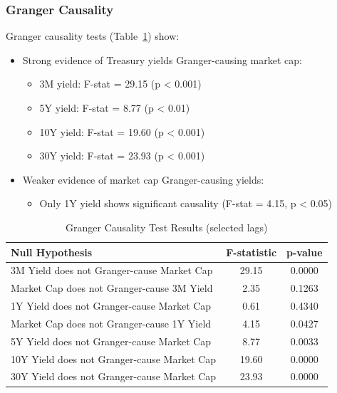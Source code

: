 \documentclass[12pt,a4paper]{article}
\begin{document}
\subsubsection{Granger Causality}
Granger causality tests (Table~\ref{tab:granger_results}) show:
\begin{itemize}
    \item Strong evidence of Treasury yields Granger-causing market cap:
    \begin{itemize}
        \item 3M yield: F-stat = 29.15 (p < 0.001)
        \item 5Y yield: F-stat = 8.77 (p < 0.01)
        \item 10Y yield: F-stat = 19.60 (p < 0.001)
        \item 30Y yield: F-stat = 23.93 (p < 0.001)
    \end{itemize}
    \item Weaker evidence of market cap Granger-causing yields:
    \begin{itemize}
        \item Only 1Y yield shows significant causality (F-stat = 4.15, p < 0.05)
    \end{itemize}
\end{itemize}

\begin{table}[H]
\centering
\caption{Granger Causality Test Results (selected lags)}
\begin{tabular}{lcc}
\toprule
Null Hypothesis & F-statistic & p-value \\
\midrule
3M Yield does not Granger-cause Market Cap & 29.15 & 0.0000 \\
Market Cap does not Granger-cause 3M Yield & 2.35 & 0.1263 \\
1Y Yield does not Granger-cause Market Cap & 0.61 & 0.4340 \\
Market Cap does not Granger-cause 1Y Yield & 4.15 & 0.0427 \\
5Y Yield does not Granger-cause Market Cap & 8.77 & 0.0033 \\
10Y Yield does not Granger-cause Market Cap & 19.60 & 0.0000 \\
30Y Yield does not Granger-cause Market Cap & 23.93 & 0.0000 \\
\bottomrule
\end{tabular}
\label{tab:granger_results}
\end{table}
\end{document}
